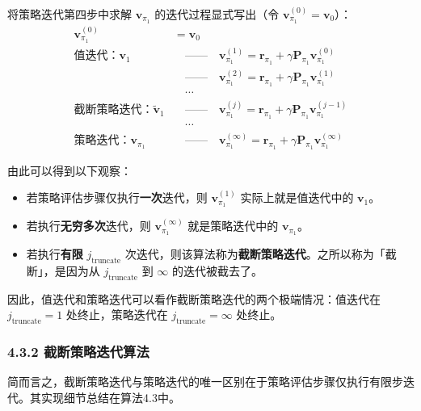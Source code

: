 \documentclass[UTF8]{article}
\begin{document}
将策略迭代第四步中求解 $\boldsymbol{v}_{\pi_1}$ 的迭代过程显式写出（令 $\boldsymbol{v}_{\pi_1}^{(0)} = \boldsymbol{v}_0$）：
\[
\begin{aligned}
\boldsymbol{v}_{\pi_1}^{(0)} &= \boldsymbol{v}_0 \\
\text{值迭代：} \boldsymbol{v}_1 &\quad\text{——}\quad \boldsymbol{v}_{\pi_1}^{(1)} = \boldsymbol{r}_{\pi_1} + \gamma \boldsymbol{P}_{\pi_1} \boldsymbol{v}_{\pi_1}^{(0)} \\
&\quad\text{——}\quad \boldsymbol{v}_{\pi_1}^{(2)} = \boldsymbol{r}_{\pi_1} + \gamma \boldsymbol{P}_{\pi_1} \boldsymbol{v}_{\pi_1}^{(1)} \\
&\quad\cdots \\
\text{截断策略迭代：} \tilde{\boldsymbol{v}}_1 &\quad\text{——}\quad \boldsymbol{v}_{\pi_1}^{(j)} = \boldsymbol{r}_{\pi_1} + \gamma \boldsymbol{P}_{\pi_1} \boldsymbol{v}_{\pi_1}^{(j-1)} \\
&\quad\cdots \\
\text{策略迭代：} \boldsymbol{v}_{\pi_1} &\quad\text{——}\quad \boldsymbol{v}_{\pi_1}^{(\infty)} = \boldsymbol{r}_{\pi_1} + \gamma \boldsymbol{P}_{\pi_1} \boldsymbol{v}_{\pi_1}^{(\infty)}
\end{aligned}
\]

由此可以得到以下观察：
\begin{itemize}
    \item 若策略评估步骤仅执行\textbf{一次}迭代，则 $\boldsymbol{v}_{\pi_1}^{(1)}$ 实际上就是值迭代中的 $\boldsymbol{v}_1$。
    \item 若执行\textbf{无穷多次}迭代，则 $\boldsymbol{v}_{\pi_1}^{(\infty)}$ 就是策略迭代中的 $\boldsymbol{v}_{\pi_1}$。
    \item 若执行\textbf{有限} $j_{\text{truncate}}$ 次迭代，则该算法称为\textbf{截断策略迭代}。之所以称为「截断」，是因为从 $j_{\text{truncate}}$ 到 $\infty$ 的迭代被截去了。
\end{itemize}

因此，值迭代和策略迭代可以看作截断策略迭代的两个极端情况：值迭代在 $j_{\text{truncate}} = 1$ 处终止，策略迭代在 $j_{\text{truncate}} = \infty$ 处终止。

\subsubsection*{4.3.2 截断策略迭代算法}

简而言之，截断策略迭代与策略迭代的唯一区别在于策略评估步骤仅执行有限步迭代。其实现细节总结在算法4.3中。
\end{document}
